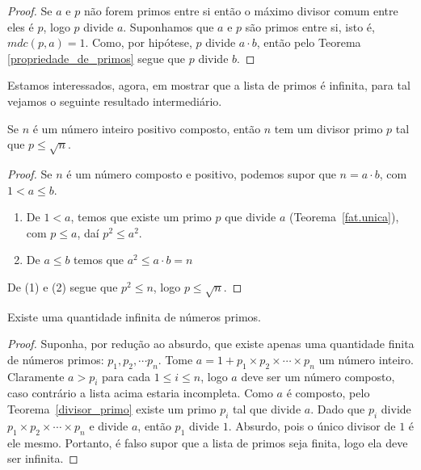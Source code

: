\begin{proof}
Se $a$ e $p$ n\~ao forem primos entre si ent\~ao o m\'aximo divisor comum entre eles \'e $p$, logo $p$ divide $a$. Suponhamos que $a$ e $p$ s\~ao primos entre si, isto \'e, $mdc(p,a)=1$. Como, por hip\'otese, $p$ divide $a\cdot b$, ent\~ao pelo Teorema \ref{propriedade_de_primos} segue que $p$ divide $b$.
\end{proof}

Estamos interessados, agora, em mostrar que a lista de primos \'e infinita, para tal vejamos o seguinte resultado intermedi\'ario.

\begin{Th}\label{divisor_primo}
Se $n$ \'e um n\'umero inteiro positivo composto, ent\~ao $n$ tem um divisor primo
$p$ tal que $p\leq\sqrt{n}$.
\end{Th}

\begin{proof}
Se $n$ \'e um n\'umero composto e positivo, podemos supor que $n=a\cdot b$, com $1<a\leq b$.
\begin{enumerate}
\item De $1<a$, temos que existe um primo $p$ que divide $a$ (Teorema~\ref{fat.unica}), com $p\leq a$, da\'i $p^2\leq a^2$.
\item De $a\leq b$ temos que $a^2\leq a\cdot b=n$
\end{enumerate}
De (1) e (2) segue que $p^2\leq n$, logo $p\leq\sqrt{n}$.
\end{proof}

\begin{Th}\label{inf.primos}
Existe uma quantidade infinita de n\'umeros primos.
\end{Th}

\begin{proof}
Suponha, por redu\c{c}\~ao ao absurdo, que existe apenas uma quantidade finita de n\'umeros primos: $p_1, p_2,\cdots p_n$. Tome $a=1+p_1\times p_2\times \cdots \times p_n$ um n\'umero inteiro. Claramente $a>p_i$ para cada $1\leq i\leq n$, logo $a$ deve ser um n\'umero composto, caso contr\'ario a lista acima estaria incompleta. Como $a$ \'{e} composto, pelo Teorema~\ref{divisor_primo} existe um primo $p_i$ tal que 
divide $a$. Dado que $p_i$ divide $p_1\times p_2\times \cdots \times p_n$ e divide $a$, ent\~ao $p_1$ divide $1$. Absurdo, pois o \'unico divisor de $1$ \'e ele mesmo. Portanto, \'e falso supor que a lista de primos seja finita, logo ela deve ser infinita.
\end{proof}

